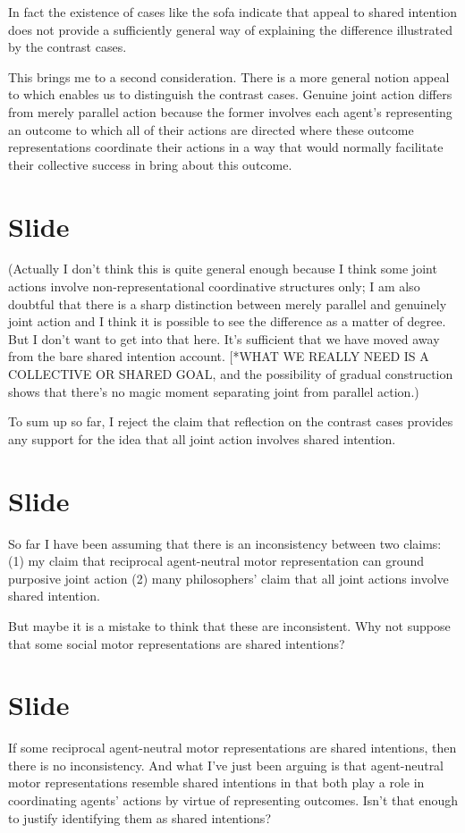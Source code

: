 \documentclass[12pt,\papersize]{extarticle}
\begin{document}
In fact the existence of cases like the sofa indicate that appeal to shared intention does not provide a sufficiently general way of explaining the difference illustrated by the contrast cases.

This brings me to a second consideration.
There is a more general notion appeal to which enables us to distinguish the contrast cases.
Genuine joint action differs from merely parallel action because the former involves each agent’s representing an outcome to which all of their actions are directed where these outcome representations coordinate their actions in a way that would normally facilitate their collective success in bring about this outcome.



\section{Slide}
(Actually I don’t think this is quite general enough because I think some joint actions involve non-representational coordinative structures only; I am also doubtful that there is a sharp distinction between merely parallel and genuinely joint action and I think it is possible to see the difference as a matter of degree. But I don’t want to get into that here.  It’s sufficient that we have moved away from the bare shared intention account. [*WHAT WE REALLY NEED IS A COLLECTIVE OR SHARED GOAL, and the possibility of gradual construction shows that there’s no magic moment separating joint from parallel action.)

To sum up so far, I reject the claim that reflection on the contrast cases provides any support for the idea that all joint action involves shared intention.



\section{Slide}
So far I have been assuming that there is an inconsistency between two claims:
(1) my claim that reciprocal  agent-neutral motor representation can ground purposive joint action
(2) many philosophers’ claim that all joint actions involve shared intention.

But maybe it is a mistake to think that these are inconsistent.
Why not suppose that some social motor representations are  shared intentions?




\section{Slide}
If some reciprocal agent-neutral motor representations are shared intentions, then there is no inconsistency.
And what I’ve just been arguing is that agent-neutral motor representations resemble shared intentions in that both play a role in coordinating agents’ actions by virtue of representing outcomes.  Isn’t that enough to justify identifying them as shared intentions?
\end{document}
